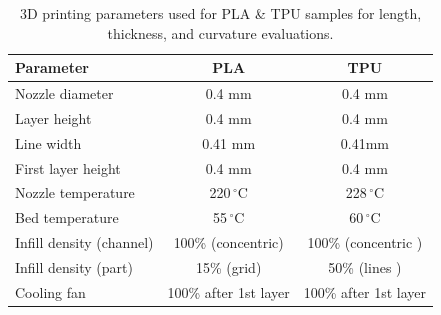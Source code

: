 \begin{table}[h]
\centering
\caption{3D printing parameters used for PLA \& TPU samples for length, thickness, and curvature evaluations.}
\label{tab:printing_params}
\begin{tabular}{lcc}
\hline
\textbf{Parameter}            & \textbf{PLA}                 & \textbf{TPU} \\ \hline
Nozzle diameter               & 0.4 mm                       & 0.4 mm \\
Layer height                  & 0.4 mm                       & 0.4 mm \\
Line width                  & 0.41 mm                       & 0.41mm \\
First layer height            & 0.4 mm                      & 0.4 mm \\
Nozzle temperature            & 220\,$^{\circ}$C             & 228\,$^{\circ}$C \\
Bed temperature               & 55\,$^{\circ}$C              & 60\,$^{\circ}$C \\
Infill density (channel)                & 100\% (concentric) & 100\% (concentric ) \\
Infill density (part)                & 15\% (grid) & 50\% (lines ) \\
Cooling fan                   & 100\% after 1st layer        & 100\% after 1st layer \\
\hline
\end{tabular}
\end{table}




